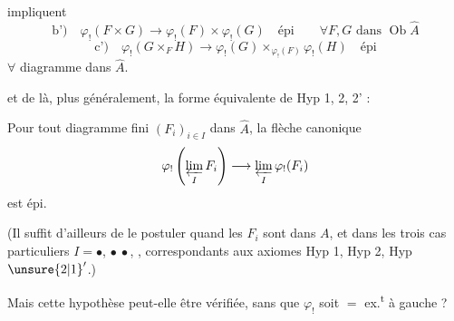
impliquent
\[
\text{b')}\quad\varphi_!(F\times G)\longrightarrow\varphi_!(F)\times\varphi_!(G)\quad\text{épi}
\qquad\forall F,G\text{ dans }\operatorname{Ob}\widehat A
\]
\[
\text{c')}\quad\varphi_!(G\times_F H)\longrightarrow
\varphi_!(G)\times_{\varphi_!(F)}\varphi_!(H)\quad\text{épi}
\]
$\forall$ diagramme
dans $\widehat A$.

et de là, plus généralement, la forme équivalente  de Hyp 1, 2, 2' :

Pour tout diagramme fini $(F_i)_{i\in I}$ dans $\widehat A$, la flèche canonique
\[
\varphi_!\left(\varprojlim_I F_i\right)\longrightarrow\varprojlim_I\varphi_!(F_i)
\]
est épi.

(Il suffit d'ailleurs de le postuler quand les $F_i$ sont dans $A$, et dans les trois cas particuliers $I=\bullet$, $\bullet\ \bullet$,
\diagram{\begin{tikzcd}[ampersand replacement=\&,column sep=tiny,row sep=tiny]
\bullet\arrow[dr]\&\&\bullet\arrow[dl]\\
\&\bullet\&
\end{tikzcd}}, correspondants aux axiomes Hyp 1, Hyp 2, Hyp $\unsure{2|1}'$.)

Mais cette hypothèse peut-elle être vérifiée, sans que $\varphi_!$ soit $=$ ex.\textsuperscript{t} à gauche ?

